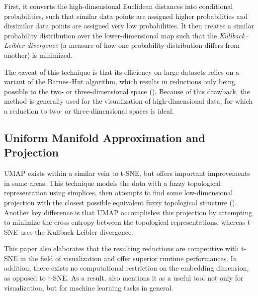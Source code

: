 \documentclass[english,bachelor,ul]{webisthesis} %
\begin{document}
First, it converts the high-dimensional Euclidean distances into conditional probabilities, such that similar data points are assigned higher probabilities and dissimilar data points are assigned very low probabilities. It then creates a similar probability distribution over the lower-dimensional map such that the \textit{Kullback--Leibler divergence} (a measure of how one probability distribution differs from another) is minimized. 

The caveat of this technique is that its efficiency on large datasets relies on a variant of the Barnes--Hut algorithm, which results in reductions only being possible to the two- or three-dimensional space (\cite{DBLP:journals/corr/abs-1301-3342}). Because of this drawback, the method is generally used for the visualization of high-dimensional data, for which a reduction to two- or three-dimensional spaces is ideal.

\subsection{Uniform Manifold Approximation and Projection}

UMAP exists within a similar vein to t-SNE, but offers important improvements in some areas. This technique models the data with a fuzzy topological representation using simplices, then attempts to find some low-dimensional projection with the closest possible equivalent fuzzy topological structure (\cite{DBLP:journals/corr/abs-1802-03426}). Another key difference is that UMAP accomplishes this projection by attempting to minimize the cross-entropy between the topological representations, whereas t-SNE uses the Kullback-Leibler divergence. 

This paper also elaborates that the resulting reductions are competitive with t-SNE in the field of visualization and offer superior runtime performances. In addition, there exists no computational restriction on the embedding dimension, as opposed to t-SNE. As a result, \cite{DBLP:journals/corr/abs-1802-03426} also mentions it as a useful tool not only for visualization, but for machine learning tasks in general.

\end{document}
